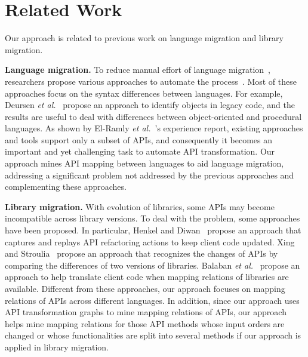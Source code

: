 \section{Related Work}
\label{sec:related} 

Our approach is related to previous work on
language migration and library migration.

\textbf{Language migration.} To reduce manual effort of language
migration~\cite{samet1981experience}, researchers propose various
approaches to automate the
process~\cite{van1999identifying,waters1988program,mossienko2003automated,yasumatsu1995spice,hainaut2008migration}.
Most of these approaches focus on the syntax differences between
languages. For example, Deursen \emph{et
al.}~\cite{van1999identifying} propose an approach to identify
objects in legacy code, and the results are useful to deal with
differences between object-oriented and procedural languages. As
shown by El-Ramly \emph{et al.}~\cite{el2006experiment}'s experience
report, existing approaches and tools support only a subset of APIs,
and consequently it becomes an important and yet challenging task to
automate API transformation. Our approach mines API mapping between
languages to aid language migration, addressing a significant
problem not addressed by the previous approaches and complementing
these approaches.

\textbf{Library migration.} With evolution of libraries, some APIs
may become incompatible across library versions. To deal with the
problem, some approaches have been proposed. In particular, Henkel
and Diwan~\cite{henkel2005catchup} propose an approach that captures
and replays API refactoring actions to keep client code updated.
Xing and Stroulia~\cite{xing2007api} propose an approach that
recognizes the changes of APIs by comparing the differences of two
versions of libraries. Balaban \emph{et
al.}~\cite{balaban2005refactoring} propose an approach to help
translate client code when mapping relations of libraries are
available. Different from these approaches, our approach focuses on
mapping relations of APIs across different languages. In addition, since
our approach uses API transformation graphs to mine mapping
relations of APIs, our approach helps mine mapping relations for
those API methods whose input orders are changed or whose
functionalities are split into several methods if our approach is
applied in library migration.
